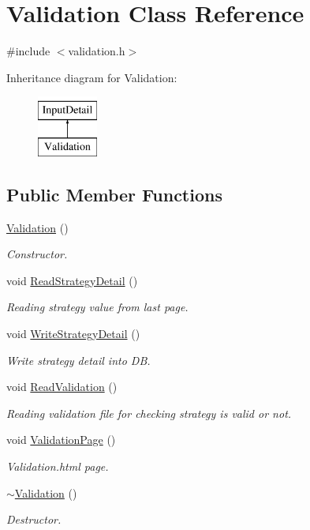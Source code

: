\hypertarget{classValidation}{\section{Validation Class Reference}
\label{classValidation}
}


{\ttfamily \#include $<$validation.\-h$>$}

Inheritance diagram for Validation\-:\begin{figure}[H]
\begin{center}
\leavevmode
\includegraphics[height=2.000000cm]{classValidation}
\end{center}
\end{figure}
\subsection*{Public Member Functions}
\begin{DoxyCompactItemize}
\item 
\hyperlink{classValidation_ada040c6d31004cc277e2b74290eec266}{Validation} ()
\begin{DoxyCompactList}\small\item\em Constructor. \end{DoxyCompactList}\item 
void \hyperlink{classValidation_ae90664b10a86d16af9991247a9875e9a}{Read\-Strategy\-Detail} ()
\begin{DoxyCompactList}\small\item\em Reading strategy value from last page. \end{DoxyCompactList}\item 
void \hyperlink{classValidation_ad4923b9d3fa95a060f922207468ae2f4}{Write\-Strategy\-Detail} ()
\begin{DoxyCompactList}\small\item\em Write strategy detail into D\-B. \end{DoxyCompactList}\item 
void \hyperlink{classValidation_a789839b45de1adfaa8e7dddb4d876376}{Read\-Validation} ()
\begin{DoxyCompactList}\small\item\em Reading validation file for checking strategy is valid or not. \end{DoxyCompactList}\item 
void \hyperlink{classValidation_af93988b87e0fd8d086e0c7aed80ba0b7}{Validation\-Page} ()
\begin{DoxyCompactList}\small\item\em Validation.\-html page. \end{DoxyCompactList}\item 
\hyperlink{classValidation_a8f5a5bdb6977eda8313bceabe8db814b}{$\sim$\-Validation} ()
\begin{DoxyCompactList}\small\item\em Destructor. \end{DoxyCompactList}\end{DoxyCompactItemize}
